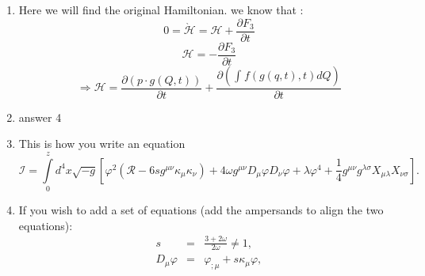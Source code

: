 \documentclass[11pt,fleqn]{article}
\begin{document}
\begin{enumerate}
\item Here we will find the original Hamiltonian.
\newline
we know that :
\begin{equation}
0=\grave{\mathcal{H}}=\mathcal{H}+\frac{\partial F_{3}}{\partial t}
\end{equation}
\begin{equation}
\mathcal{H}=-\frac{\partial F_{3}}{\partial t}
\end{equation}
\begin{equation}
\Rightarrow\boxed{\mathcal{H}=\frac{\partial (p\cdot g(Q,t))}{\partial t}+\frac{\partial (\int_{}^{}f(g(q,t),t)dQ)}{\partial t}}
\end{equation}
\item answer 4
\item This is how you write an equation
\begin{equation}
\mathcal{I} =\int \limits_0^z  d^4x \sqrt{-g}\left[\varphi^2\left(\mathcal{R}-6sg^{\mu \nu} \kappa_\mu \kappa_\nu\right) + 4 \omega g^{\mu \nu}D_\mu \varphi D_\nu \varphi + \lambda \varphi^4 + \frac{1}{4}g^{\mu \nu} g^{\lambda \sigma}X_{\mu \lambda}X_{\nu \sigma}\right].
\end{equation}

\item If you wish to add a set of equations (add the ampersands to align the two equations):
\begin{eqnarray}
 s &=& \frac{3+2\omega}{2\omega}\neq 1,\\
 D_\mu \varphi &=& \varphi_{;\mu} + s \kappa_\mu \varphi,
\end{eqnarray}


\end{enumerate}
\end{document}
